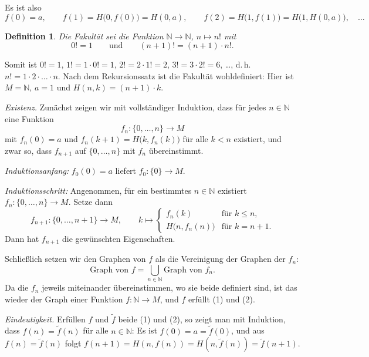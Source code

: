\documentclass[a4paper]{article}
\makeatletter
\theoremstyle{kurzskript}
\newtheorem{definition}[satz]{Definition}
\renewenvironment{proof}[1][\proofname]{\par\pushQED{\qed}%
  \normalfont\topsep\medskipamount\relax
  \trivlist\item[\hskip\labelsep\bfseries #1\@addpunct{.}]\ignorespaces}%
  {\popQED\endtrivlist\@endpefalse}
\renewcommand{\proofname}{Beweis}
\newcommand{\N}{\mathbb{N}}
\makeatother
\begin{document}
Es ist also
\[
  f(0) = a, \qquad f(1) = H\bigl(0, f(0)\bigr) = H(0, a), \qquad f(2) = H\bigl(1, f(1)\bigr) = H\bigl(1, H(0, a)\bigr), \quad \dots
\]

\begin{definition}
Die \emph{Fakultät} sei die Funktion $\N \to \N$, $n \mapsto n!$ mit
\[
  0! = 1 \qquad\text{und}\qquad (n + 1)! = (n + 1) \cdot n!.
\]
\end{definition}

Somit ist $0! = 1$, $1! = 1 \cdot 0! = 1$, $2! = 2 \cdot 1! = 2$, $3! = 3 \cdot 2! = 6$, \dots, d.\,h.\ $n! = 1 \cdot 2 \cdot \ldots \cdot n$. Nach dem Rekursionssatz ist die Fakultät wohldefiniert: Hier ist $M = \N$, $a = 1$ und $H(n, k) = (n + 1) \cdot k$.

\begin{proof}[Beweis von Satz~\ref{satz:rekursion}]
\emph{Existenz.} Zunächst zeigen wir mit vollständiger Induktion, dass für jedes $n \in \N$ eine Funktion
\[
  f_n\colon \{0, \dots, n\} \to M
\]
mit $f_n(0) = a$ und $f_n(k + 1) = H\bigl(k, f_n(k)\bigr)$ für alle $k < n$ existiert, und zwar so, dass $f_{n+1}$ auf $\{0, \dots, n\}$ mit $f_n$ übereinstimmt.

\emph{Induktionsanfang:} $f_0(0) = a$ liefert $f_0\colon \{0\} \to M$.

\emph{Induktionsschritt:} Angenommen, für ein bestimmtes $n \in \N$ existiert $f_n\colon \{0, \dots, n\} \to M$. Setze dann
\[
  f_{n+1}\colon \{0, \dots, n + 1\} \to M, \qquad
  k \mapsto
  \begin{cases}
    f_n(k) & \text{für } k \leq n,\\
    H\bigl(n, f_n(n)\bigr) & \text{für } k = n + 1.
  \end{cases}
\]
Dann hat $f_{n+1}$ die gewünschten Eigenschaften.

Schließlich setzen wir den Graphen von $f$ als die Vereinigung der Graphen der $f_n$:
\[
  \text{Graph von } f = \bigcup_{n \in \N} \text{Graph von } f_n.
\]
Da die $f_n$ jeweils miteinander übereinstimmen, wo sie beide definiert sind, ist das wieder der Graph einer Funktion $f\colon \N \to M$, und $f$ erfüllt (1) und (2).

\emph{Eindeutigkeit.} Erfüllen $f$ und $\tilde f$ beide (1) und (2), so zeigt man mit Induktion, dass $f(n) = \tilde f(n)$ für alle $n \in \N$: Es ist $f(0) = a = \tilde f(0)$, und aus $f(n) = \tilde f(n)$ folgt $f(n + 1) = H(n, f(n)) = H(n, \tilde f(n)) = \tilde f(n + 1)$.
\end{proof}

\end{document}
